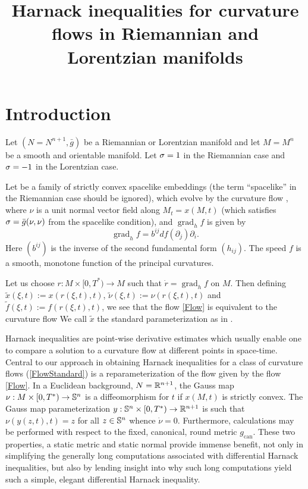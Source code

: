 
\usepackage{mathrsfs}
\DeclareMathOperator{\ad}{ad}



\title[Harnack inequalities for curvature flows]{Harnack inequalities for curvature flows in Riemannian and Lorentzian manifolds}
\maketitle
\section{Introduction}
\label{sec:intro}
Let $(N=N^{n+1},\bar{g})$ be a Riemannian or Lorentzian manifold and let $M=M^{n}$ be a smooth and orientable manifold. Let $\s = 1$ in the Riemannian case and $\s = -1$ in the Lorentzian case.

Let
\eq{x\cn M\x[0,T^{\ast})\ra N}
be a family of strictly convex spacelike embeddings (the term ``spacelike'' in the Riemannian case should be ignored), which evolve by the curvature flow
,
where $\nu$ is a unit normal vector field along $M_{t}=x(M,t)$ (which satisfies $\s=\bar{g}(\nu,\nu)$ from the spacelike condition), and $\operatorname{grad}_hf$ is given by
\[\operatorname{grad}_hf=b^{ij}df(\partial_j)\partial_i.\]
Here $(b^{ij})$ is the inverse of the second fundamental form $(h_{ij})$. The speed $f$ is a smooth, monotone function of the principal curvatures.

Let us choose \(r:M\times [0,T^{\ast})\to M\) such that $\dot{r}=\operatorname{grad}_hf$ on $M$. Then defining $\tilde{x} (\xi, t) := x (r(\xi,t), t)$, $\tilde{\nu} (\xi, t) :=\nu (r(\xi,t), t)$ and $\tilde{f}(\xi,t):=f(r(\xi,t), t)$, we see that the flow \eqref{Flow} is equivalent to the curvature flow
\eq{\label{FlowStandard}
\tilde{x}&:M\times [0,T^{\ast})\to N\\
\dot{\tilde{x}} &= -\s \tilde{f} \tilde{\nu}.}
We call $\tilde{x}$ the standard parameterization as in \cite{Andrews:09/1994}.

Harnack inequalities are point-wise derivative estimates which usually enable one to compare a solution to a curvature flow at different points in space-time.
Central to our approach in obtaining Harnack inequalities for a class of curvature flows (\ref{FlowStandard}) is a reparameterization of the flow given by the flow \eqref{Flow}.
In a Euclidean background, $N = \R^{n+1}$, the Gauss map $\nu: M\times [0,T^{\ast}) \to \S^n$ is a diffeomorphism for $t$ if $x(M,t)$ is strictly convex. The Gauss map parameterization $y: \S^n\times [0,T^{\ast}) \to \R^{n+1}$ \cite{Andrews:09/1994} is such that $\nu(y(z,t),t) = z$ for all $z \in \S^n$ whence $\dot{\nu} = 0$. Furthermore, calculations may be performed with respect to the fixed, canonical, round metric $g_{\operatorname{can}}$. These two properties, a static metric and static normal provide immense benefit, not only in simplifying the generally long computations associated with differential Harnack inequalities, but also by lending insight into why such long computations yield such a simple, elegant differential Harnack inequality.

